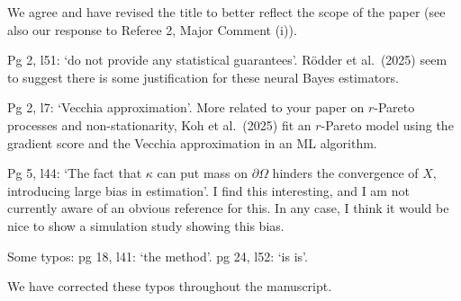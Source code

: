 \documentclass[12pt
]{article}
\begin{document}
\begin{Res}
We agree and have revised the title to better reflect the scope of the paper (see also our response to Referee 2, Major Comment (i)).
\end{Res}

\begin{Comments}
Pg 2, l51: `do not provide any statistical guarantees'. R\"{o}dder et al.\ (2025) seem to suggest there is some justification for these neural Bayes estimators.
\end{Comments}

\begin{Res}
\end{Res}

\begin{Comments}
Pg 2, l7: `Vecchia approximation'. More related to your paper on $r$-Pareto processes and non-stationarity, Koh et al.\ (2025) fit an $r$-Pareto model using the gradient score and the Vecchia approximation in an ML algorithm.
\end{Comments}

\begin{Res}
\end{Res}

\begin{Comments}
Pg 5, l44: `The fact that $\kappa$ can put mass on $\partial\Omega$ hinders the convergence of $X$, introducing large bias in estimation'. I find this interesting, and I am not currently aware of an obvious reference for this. In any case, I think it would be nice to show a simulation study showing this bias.
\end{Comments}

\begin{Res}
\end{Res}

\begin{Comments}
Some typos: pg 18, l41: `the method'. pg 24, l52: `is is'.
\end{Comments}

\begin{Res}
We have corrected these typos throughout the manuscript.
\end{Res}
\end{document}
